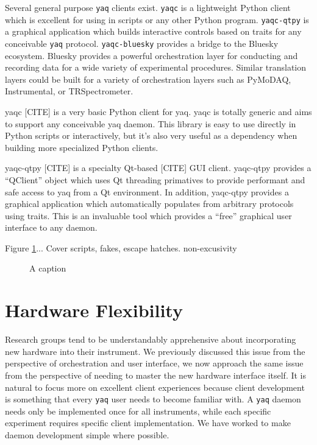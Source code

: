 \documentclass[aip, amsmath, amssymb, reprint,]{revtex4-1}
\newcommand\yaq{\texttt{yaq}}
\begin{document}
Several general purpose \yaq{} clients exist.
\texttt{yaqc}\cite{} is a lightweight Python client which is excellent for using in scripts or any other Python program.
\texttt{yaqc-qtpy}\cite{} is a graphical application which builds interactive controls based on traits for any conceivable \yaq{} protocol.
\texttt{yaqc-bluesky}\cite{} provides a bridge to the Bluesky ecosystem\cite{}.
Bluesky provides a powerful orchestration layer for conducting and recording data for a wide variety of experimental procedures.
Similar translation layers could be built for a variety of orchestration layers such as PyMoDAQ\cite{}, Instrumental\cite{}, or TRSpectrometer\cite{}.

yaqc [CITE] is a very basic Python client for yaq.
yaqc is totally generic and aims to support any conceivable yaq daemon.
This library is easy to use directly in Python scripts or interactively, but it's also very useful as a dependency when building more specialized Python clients.

yaqc-qtpy [CITE] is a specialty Qt-based [CITE] GUI client.
yaqc-qtpy provides a ``QClient'' object which uses Qt threading primatives to provide performant and safe access to yaq from a Qt environment.
In addition, yaqc-qtpy provides a graphical application which automatically populates from arbitrary protocols using traits.
This is an invaluable tool which provides a ``free'' graphical user interface to any daemon.


Figure \ref{fig:foundation}...
Cover scripts, fakes, escape hatches.
non-excusivity

\begin{figure}
  \caption{  \label{fig:foundation} A caption}
\end{figure}


\section{Hardware Flexibility}

Research groups tend to be understandably apprehensive about incorporating new hardware into their instrument.
We previously discussed this issue from the perspective of orchestration and user interface, we now approach the same issue from the perspective of needing to master the new hardware interface itself.
It is natural to focus more on excellent client experiences because client development is something that every \yaq{} user needs to become familiar with.
A \yaq{} daemon needs only be implemented once for all instruments, while each specific experiment requires specific client implementation.
We have worked to make daemon development simple where possible.
\end{document}
